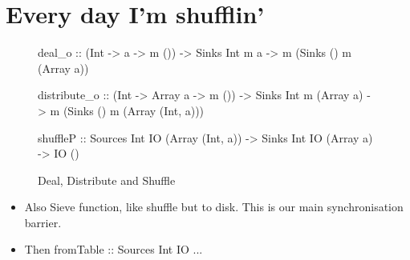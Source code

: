 \clearpage{}
\section{Every day I'm shufflin'}


\begin{figure}
\begin{code}
deal_o       :: (Int -> a -> m ()) 
             -> Sinks Int m a         -> m (Sinks () m (Array a))

distribute_o :: (Int -> Array a -> m ())
             -> Sinks Int m (Array a) -> m (Sinks () m (Array (Int, a)))

shuffleP     :: Sources Int IO (Array (Int, a))
             -> Sinks   Int IO (Array a)
             -> IO ()
\end{code}
\caption{Deal, Distribute and Shuffle}
\end{figure}



\begin{itemize}
\item Also Sieve function, like shuffle but to disk.
      This is our main synchronisation barrier.
\item Then fromTable :: Sources Int IO ...
\end{itemize}
